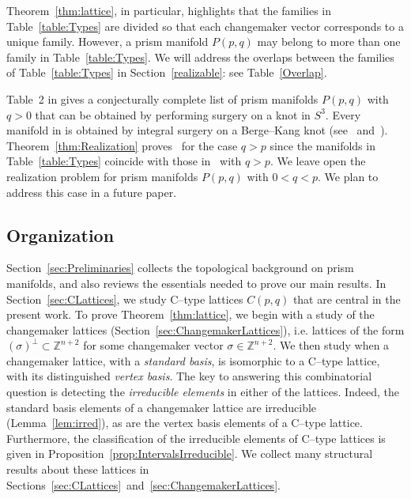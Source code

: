 {\rmk Theorem~\ref{thm:lattice}, in particular, highlights that the families in Table~\ref{table:Types} are divided so that each changemaker vector corresponds to a unique family. However, a prism manifold $P(p, q)$ may belong to more than one family in Table~\ref{table:Types}. %
We will address the overlaps between the families of Table~\ref{table:Types} in Section~\ref{realizable}: see Table~\ref{Overlap}.






Table~2 in \cite{Prism2016} gives a conjecturally complete list of prism manifolds $P(p,q)$ with $q>0$ that can be obtained by performing surgery on a knot in $S^3$. Every manifold in \cite[Table~2]{Prism2016} is obtained by integral surgery on a {Berge--Kang knot} (see~\cite[Table~4]{Prism2016} and~\cite{BergeKang}). Theorem~\ref{thm:Realization} proves~\cite[Conjecture~1.6]{Prism2016} for the case $q>p$ since the manifolds in Table~\ref{table:Types} coincide with those in~\cite[Table~2]{Prism2016} with $q>p$. We leave open the realization problem for prism manifolds $P(p,q)$ with $0<q<p$. We plan to address this case in a future paper.

  
\subsection{Organization} Section~\ref{sec:Preliminaries} collects the topological background on prism manifolds, and also reviews the essentials needed to prove our main results. In Section~\ref{sec:CLattices}, we study C--type lattices $C(p,q)$ that are central in the present work. To prove Theorem~\ref{thm:lattice}, we begin with a study of the changemaker lattices (Section~\ref{sec:ChangemakerLattices}), i.e. lattices of the form $(\sigma)^{\perp}\subset \mathbb Z^{n+2}$ for some changemaker vector $\sigma\in \mathbb Z^{n+2}$. We then study when a changemaker lattice, with a {\it standard basis}, is isomorphic to a C--type lattice, with its distinguished {\it vertex basis}. The key to answering this combinatorial question is detecting the {\it irreducible elements} in either of the lattices. Indeed, the standard basis elements of a changemaker lattice are irreducible (Lemma~\ref{lem:irred}), as are the vertex basis elements of a C--type lattice. Furthermore, the classification of the irreducible elements of C--type lattices is given in Proposition~\ref{prop:IntervalsIrreducible}. We collect many structural results about these lattices in Sections~\ref{sec:CLattices}~and~\ref{sec:ChangemakerLattices}.

}
